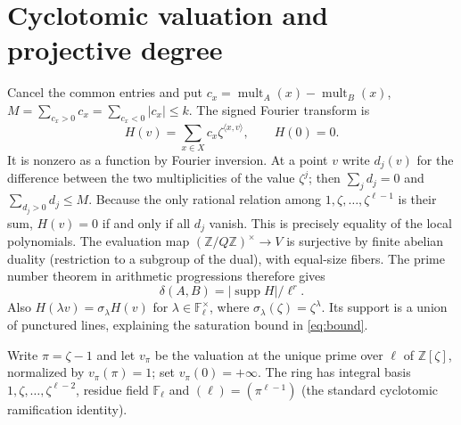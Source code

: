 \documentclass[11pt]{article}
\theoremstyle{remark}\newtheorem{remark}[theorem]{Remark}
\newcommand{\F}{\mathbb F}
\newcommand{\Z}{\mathbb Z}
\newcommand{\supp}{\operatorname{supp}}
\begin{document}
\section{Cyclotomic valuation and projective degree}
Cancel the common entries and put $c_x=\operatorname{mult}_A(x)-\operatorname{mult}_B(x)$, $M=\sum_{c_x>0}c_x=\sum_{c_x<0}|c_x|\le k$. The signed Fourier transform is
\[
 H(v)=\sum_{x\in X}c_x\zeta^{\langle x,v\rangle},\qquad H(0)=0.
\]
It is nonzero as a function by Fourier inversion. At a point $v$ write $d_j(v)$ for the difference between the two multiplicities of the value $\zeta^j$; then $\sum_jd_j=0$ and $\sum_{d_j>0}d_j\le M$. Because the only rational relation among $1,\zeta,\dots,\zeta^{\ell-1}$ is their sum, $H(v)=0$ if and only if all $d_j$ vanish. This is precisely equality of the local polynomials. The evaluation map $(\Z/Q\Z)^\times\to V$ is surjective by finite abelian duality (restriction to a subgroup of the dual), with equal-size fibers. The prime number theorem in arithmetic progressions therefore gives
\begin{equation}\label{eq:delta}
 \delta(A,B)=|\supp H|/\ell^r.
\end{equation}
Also $H(\lambda v)=\sigma_\lambda H(v)$ for $\lambda\in\F_\ell^\times$, where $\sigma_\lambda(\zeta)=\zeta^\lambda$. Its support is a union of punctured lines, explaining the saturation bound in \eqref{eq:bound}.

Write $\pi=\zeta-1$ and let $v_\pi$ be the valuation at the unique prime over $\ell$ of $\Z[\zeta]$, normalized by $v_\pi(\pi)=1$; set $v_\pi(0)=+\infty$. The ring has integral basis $1,\zeta,\dots,\zeta^{\ell-2}$, residue field $\F_\ell$ and $(\ell)=(\pi^{\ell-1})$ (the standard cyclotomic ramification identity).
\end{document}
